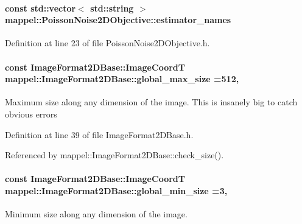 \paragraph[{\texorpdfstring{estimator\+\_\+names}{estimator_names}}]{\setlength{\rightskip}{0pt plus 5cm}const std\+::vector$<$ std\+::string $>$ mappel\+::\+Poisson\+Noise2\+D\+Objective\+::estimator\+\_\+names\hspace{0.3cm}{\ttfamily [static]}}\hypertarget{classmappel_1_1PoissonNoise2DObjective_ac661699516dcee8b4e8a440e9b8b62d1}{}\label{classmappel_1_1PoissonNoise2DObjective_ac661699516dcee8b4e8a440e9b8b62d1}


Definition at line 23 of file Poisson\+Noise2\+D\+Objective.\+h.

\paragraph[{\texorpdfstring{global\+\_\+max\+\_\+size}{global_max_size}}]{\setlength{\rightskip}{0pt plus 5cm}const {\bf Image\+Format2\+D\+Base\+::\+Image\+CoordT} mappel\+::\+Image\+Format2\+D\+Base\+::global\+\_\+max\+\_\+size =512\hspace{0.3cm}{\ttfamily [static]}, {\ttfamily [inherited]}}\hypertarget{classmappel_1_1ImageFormat2DBase_a11c9bb87930f597dff17e9923b73bf5e}{}\label{classmappel_1_1ImageFormat2DBase_a11c9bb87930f597dff17e9923b73bf5e}
Maximum size along any dimension of the image. This is insanely big to catch obvious errors 

Definition at line 39 of file Image\+Format2\+D\+Base.\+h.



Referenced by mappel\+::\+Image\+Format2\+D\+Base\+::check\+\_\+size().

\paragraph[{\texorpdfstring{global\+\_\+min\+\_\+size}{global_min_size}}]{\setlength{\rightskip}{0pt plus 5cm}const {\bf Image\+Format2\+D\+Base\+::\+Image\+CoordT} mappel\+::\+Image\+Format2\+D\+Base\+::global\+\_\+min\+\_\+size =3\hspace{0.3cm}{\ttfamily [static]}, {\ttfamily [inherited]}}\hypertarget{classmappel_1_1ImageFormat2DBase_a1149e8545d3cfaa40c2f3bc02e3223b2}{}\label{classmappel_1_1ImageFormat2DBase_a1149e8545d3cfaa40c2f3bc02e3223b2}
Minimum size along any dimension of the image. 

